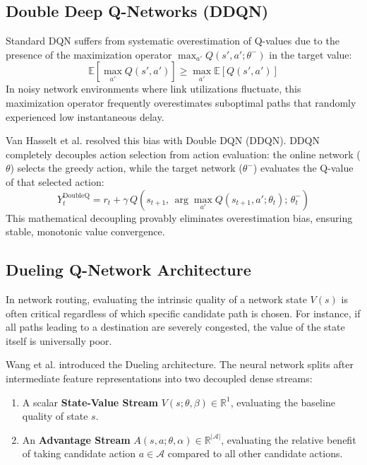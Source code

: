 \subsection{Double Deep Q-Networks (DDQN)}
Standard DQN suffers from systematic overestimation of Q-values due to the presence of the maximization operator $\max_{a'} Q(s', a'; \theta^-)$ in the target value:
\begin{equation}
    \mathbb{E}\left[ \max_{a'} Q(s', a') \right] \ge \max_{a'} \mathbb{E}\left[ Q(s', a') \right]
\end{equation}
In noisy network environments where link utilizations fluctuate, this maximization operator frequently overestimates suboptimal paths that randomly experienced low instantaneous delay.

Van Hasselt et al. \cite{vanhasselt2016deep} resolved this bias with Double DQN (DDQN). DDQN completely decouples action selection from action evaluation: the online network ($\theta$) selects the greedy action, while the target network ($\theta^-$) evaluates the Q-value of that selected action:
\begin{equation}
    Y_t^{\text{DoubleQ}} = r_t + \gamma \, Q\left(s_{t+1}, \, \arg\max_{a'} Q(s_{t+1}, a'; \theta_t); \, \theta_t^-\right)
    \label{eq:double_dqn_target}
\end{equation}
This mathematical decoupling provably eliminates overestimation bias, ensuring stable, monotonic value convergence.

\subsection{Dueling Q-Network Architecture}
In network routing, evaluating the intrinsic quality of a network state $V(s)$ is often critical regardless of which specific candidate path is chosen. For instance, if all paths leading to a destination are severely congested, the value of the state itself is universally poor.

Wang et al. \cite{wang2016dueling} introduced the Dueling architecture. The neural network splits after intermediate feature representations into two decoupled dense streams:
\begin{enumerate}
    \item A scalar \textbf{State-Value Stream} $V(s; \theta, \beta) \in \mathbb{R}^1$, evaluating the baseline quality of state $s$.
    \item An \textbf{Advantage Stream} $A(s, a; \theta, \alpha) \in \mathbb{R}^{|\mathcal{A}|}$, evaluating the relative benefit of taking candidate action $a \in \mathcal{A}$ compared to all other candidate actions.
\end{enumerate}

